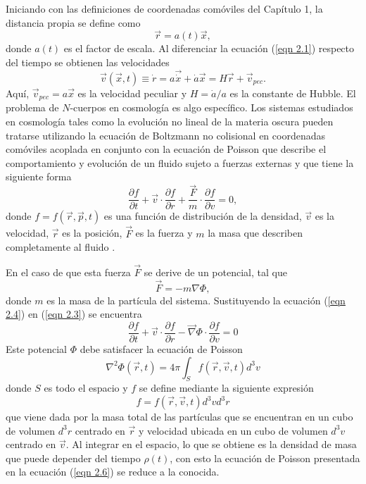 \documentclass[a4paper,openright,12pt]{book}
\begin{document}
Iniciando con las definiciones de coordenadas comóviles del Capítulo 1, la distancia propia se define como  
\begin{equation}
\vec{r} = a(t)\vec{x},\label{eqn 2.1}
\end{equation}
donde $a(t)$ es el factor de escala. Al diferenciar la ecuación (\ref{eqn 2.1}) respecto del tiempo se obtienen las velocidades
\begin{equation}
\vec{v}(\vec{x},t)\equiv\dot{r}=a\vec{\dot{x}}+\dot{a}\vec{x}
=H\vec{r}+\vec{v}_{pec}.\label{eqn 2.2}
\end{equation}
Aquí, $\vec{v}_{pec}=a\vec{x}$ es la velocidad peculiar y $H=\dot{a}/a$ es la constante de Hubble. El problema de $N$-cuerpos en cosmología es algo específico.  Los sistemas estudiados en cosmología tales como la evolución no lineal de la materia oscura pueden tratarse utilizando la ecuación de Boltzmann no colisional en coordenadas comóviles acoplada en conjunto con la ecuación de Poisson que describe el comportamiento y evolución de un fluido sujeto a fuerzas externas y que tiene la siguiente forma 
\begin{equation}
\frac{\partial f}{\partial t} + \vec{v}\cdot\frac{\partial f}{\partial r} + \frac{\vec{F}}{m}\cdot\frac{\partial f}{\partial v}=0,\label{eqn 2.3}
\end{equation}
donde $f= f(\vec{r}, \vec{p}, t)$ es una función de distribución de la densidad, $\vec{v}$ es la velocidad, $\vec{r}$ es la posición, $\vec{F}$ es la fuerza y $m$ la masa que describen completamente al fluido \cite{b3}.

En el caso de que esta fuerza $\vec{F}$ se derive de un potencial, tal que 
\begin{equation}
\vec{F} = -m\nabla\Phi,\label{eqn 2.4}
\end{equation}
donde $m$ es la masa de la partícula del sistema. Sustituyendo la ecuación (\ref{eqn 2.4}) en (\ref{eqn 2.3}) se encuentra
\begin{equation}
\frac{\partial f}{\partial t} + \vec{v}\cdot\frac{\partial f}{\partial r} - \vec\nabla\Phi\cdot\frac{\partial f}{\partial v}=0\label{eqn 2.5}
\end{equation} 
Este potencial $\Phi$ debe satisfacer la ecuación de Poisson
\begin{equation}
\nabla^{2} \Phi (\vec{r},t) = 4\pi \int_{S} f(\vec{r},\vec{v},t)d^{3}v\label{eqn 2.6}
\end{equation}
donde $S$ es todo el espacio y $f$ se define mediante la siguiente expresión
\begin{equation}
f = f(\vec{r},\vec{v},t)d^{3}v d^{3}r\label{eqn 2.7}
\end{equation}
que viene dada por la masa total de las partículas que se encuentran en un cubo de volumen $d^{3}r$ centrado en $\vec{r}$ y velocidad ubicada en un cubo de volumen $d^{3}v$ centrado en $\vec{v}$. Al integrar en el espacio, lo que se obtiene es la densidad de masa que puede depender del tiempo $\rho(t)$, con esto la ecuación de Poisson presentada en la ecuación (\ref{eqn 2.6}) se reduce a la conocida.
\end{document}
